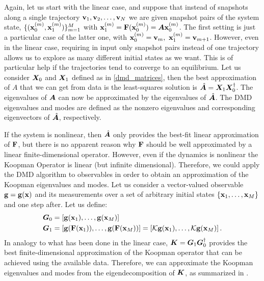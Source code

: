 Again, let us start with the linear case, and suppose that instead of snapshots along a single trajectory $\vb{v}_1, \vb{v}_2, \dots, \vb{v}_N$ we are given snapshot pairs of the system state, $\{(\vb{x}_0^{(m)}, \vb{x}_1^{(m)})\}_{m = 1}^M$ with $\vb{x}_1^{(m)} = \vb{F}(\vb{x}_0^{(m)}) = \vb*{A}\vb{x}_0^{(m)}$. The first setting is just a particular case of the latter one, with $\vb{x}_0^{(m)} = \vb{v}_m,\,\,\vb{x}_1^{(m)} = \vb{v}_{m+1}$. However, even in the linear case, requiring in input only snapshot pairs instead of one trajectory allows us to explore as many different initial states as we want. This is of particular help if the trajectories tend to converge to an equilibrium. Let us consider $\vb*{X}_0$ and $\vb*{X}_1$ defined as in \eqref{dmd_matrices}, then the best approximation of $A$ that we can get from data is the least-squares solution is $\hat{\vb*{A}} = \vb*{X}_1\vb*{X}_0^{\dagger}$. The eigenvalues of $\vb*{A}$ can now be approximated by the eigenvalues of $\hat{\vb*{A}}$. The DMD eigenvalues and modes are defined as the nonzero eigenvalues and corresponding eigenvectors of $\hat{\vb*{A}}$, respectively.

If the system is nonlinear, then $\hat{\vb*{A}}$ only provides the best-fit linear approximation of $\vb{F}$, but there is no apparent reason why $\vb{F}$ should be well approximated by a linear finite-dimensional operator. However, even if the dynamics is nonlinear the Koopman Operator is linear (but infinite dimensional). Therefore, we could apply the DMD algorithm to observables in order to obtain an approximation of the Koopman eigenvalues and modes. Let us consider a vector-valued observable $\vb{g} = \vb{g}(\vb{x})$ and its measurements over a set of arbitrary initial states $\{\vb{x}_1,\dots, \vb{x}_M\}$ and one step after. Let us define:
\begin{equation}
    \label{dmd_koopman_matrices}
    \begin{split}
        \vb*{G}_0 &= \left[\vb{g}(\vb{x}_1), \dots, \vb{g}(\vb{x}_M)\right] \\
        \vb*{G}_1 &= \left[\vb{g}(\vb{F}(\vb{x}_1)), \dots, \vb{g}(\vb{F}(\vb{x}_M))\right] = \left[\mathcal{K}\vb{g}(\vb{x}_1), \dots, \mathcal{K}\vb{g}(\vb{x}_M)\right].\\
    \end{split}
\end{equation}
In analogy to what has been done in the linear case, $\vb*{K} = \vb*{G}_1\vb*{G}_0^{\dagger}$ provides the best finite-dimensional approximation of the Koopman operator that can be achieved using the available data. Therefore, we can approximate the Koopman eigenvalues and modes from the eigendecomposition of $\vb*{K}$, as summarized in .

